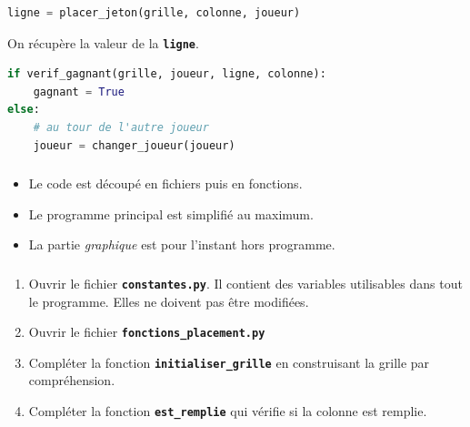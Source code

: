 \documentclass[svgnames,11pt]{beamer}
\begin{document}
\begin{frame}[fragile]

    \begin{center}
    \begin{lstlisting}[language=Python , basicstyle=\ttfamily\small, xleftmargin=2em, xrightmargin=2em]
ligne = placer_jeton(grille, colonne, joueur)
\end{lstlisting}
    \end{center}
\begin{aretenir}[Remarque]
On récupère la valeur de la \textbf{\texttt{ligne}}.
\end{aretenir}
\end{frame}
\begin{frame}[fragile]

    \begin{center}
    \begin{lstlisting}[language=Python , basicstyle=\ttfamily\small, xleftmargin=1em, xrightmargin=0em]
if verif_gagnant(grille, joueur, ligne, colonne):
    gagnant = True
else:
    # au tour de l'autre joueur
    joueur = changer_joueur(joueur)
\end{lstlisting}
    \end{center}
\end{frame}
\begin{frame}
    \frametitle{}

    \begin{aretenir}[Remarques]
    
        \begin{itemize}
            \item Le code est découpé en fichiers puis en fonctions.
            \item Le programme principal est simplifié au maximum.
            \item La partie \emph{graphique} est pour l'instant hors programme.
        \end{itemize}
    \end{aretenir}

\end{frame}
\begin{frame}
    \frametitle{}

    \begin{activite}
    \begin{enumerate}
        \item Ouvrir le fichier \textbf{\texttt{constantes.py}}. Il contient des variables utilisables dans tout le programme. Elles ne doivent pas être modifiées.
        \item Ouvrir le fichier \textbf{\texttt{fonctions\_placement.py}}
        \item Compléter la fonction \textbf{\texttt{initialiser\_grille}} en construisant la grille par compréhension.
        \item Compléter la fonction \textbf{\texttt{est\_remplie}} qui vérifie si la colonne est remplie.
    \end{enumerate}
    \end{activite}
\end{frame}
\end{document}
